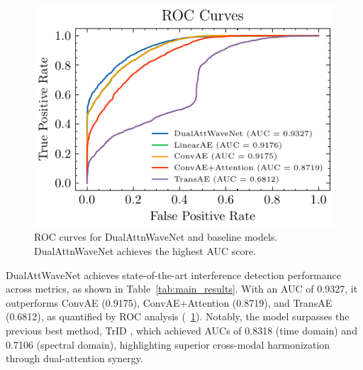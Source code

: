 \documentclass[10pt, conference]{IEEEtran}
\begin{document}
\begin{figure}[tb]
    \centering
    \includegraphics[width=0.8\linewidth]{roc-comparison.pdf}
    \caption{ROC curves for DualAttnWaveNet and baseline models. DualAttnWaveNet achieves the highest AUC score.}
    \label{fig:roc_comparison}
\end{figure}

DualAttWaveNet achieves state-of-the-art interference detection performance across metrics, as shown in Table~\ref{tab:main_results}. With an AUC of 0.9327, it outperforms ConvAE (0.9175), ConvAE+Attention (0.8719), and TransAE (0.6812), as quantified by ROC analysis (\figurename~\ref{fig:roc_comparison}). Notably, the model surpasses the previous best method, TrID \cite{saifaldawlaGenAIBasedModelsNGSO2024}, which achieved AUCs of 0.8318 (time domain) and 0.7106 (spectral domain), highlighting superior cross-modal harmonization through dual-attention synergy.
\end{document}
